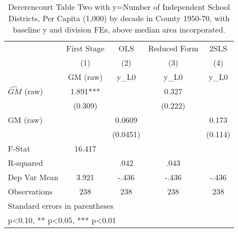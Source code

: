 \begin{table}[htbp]\centering
\def\sym#1{\ifmmode^{#1}\else\(^{#1}\)\fi}
\caption{Dererencourt Table Two with y=Number of Independent School Districts, Per Capita (1,000) by decade in County 1950-70, with baseline y and division FEs, above median area incorporated.}
\begin{tabular}{l*{4}{c}}
\toprule
                    & First Stage   &         OLS   &Reduced Form   &        2SLS   \\
                    &\multicolumn{1}{c}{(1)}&\multicolumn{1}{c}{(2)}&\multicolumn{1}{c}{(3)}&\multicolumn{1}{c}{(4)}\\
                    &\multicolumn{1}{c}{GM  (raw)}&\multicolumn{1}{c}{y\_L0}&\multicolumn{1}{c}{y\_L0}&\multicolumn{1}{c}{y\_L0}\\
\midrule
$\hat{GM}$ (raw)    &       1.891***&               &       0.327   &               \\
                    &     (0.309)   &               &     (0.222)   &               \\
\addlinespace
GM  (raw)           &               &      0.0609   &               &       0.173   \\
                    &               &    (0.0451)   &               &     (0.114)   \\
\midrule
F-Stat              &      16.417   &               &               &               \\
R-squared           &               &        .042   &        .043   &               \\
Dep Var Mean        &       3.921   &       -.436   &       -.436   &       -.436   \\
Observations        &         238   &         238   &         238   &         238   \\
\bottomrule
\multicolumn{5}{l}{\footnotesize Standard errors in parentheses}\\
\multicolumn{5}{l}{\footnotesize * p<0.10, ** p<0.05, *** p<0.01}\\
\end{tabular}
\end{table}
